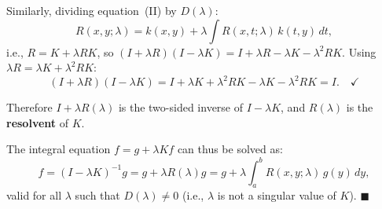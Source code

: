 \documentclass[12pt]{article}
\begin{document}
Similarly, dividing equation~(II) by $D(\lambda)$:
\[
R(x,y;\lambda) = k(x,y) + \lambda\int R(x,t;\lambda)\,k(t,y)\,dt,
\]
i.e., $R = K + \lambda RK$, so $(I + \lambda R)(I - \lambda K) = I + \lambda R - \lambda K - \lambda^2 RK$. Using $\lambda R = \lambda K + \lambda^2 RK$:
\[
(I + \lambda R)(I - \lambda K) = I + \lambda K + \lambda^2 RK - \lambda K - \lambda^2 RK = I. \quad \checkmark
\]

Therefore $I + \lambda R(\lambda)$ is the two-sided inverse of $I - \lambda K$, and $R(\lambda)$ is the \textbf{resolvent} of $K$.

The integral equation $f = g + \lambda Kf$ can thus be solved as:
\[
f = (I - \lambda K)^{-1}g = g + \lambda R(\lambda)g = g + \lambda\int_a^b R(x,y;\lambda)\,g(y)\,dy,
\]
valid for all $\lambda$ such that $D(\lambda) \neq 0$ (i.e., $\lambda$ is not a singular value of $K$). \hfill $\blacksquare$
\end{document}
